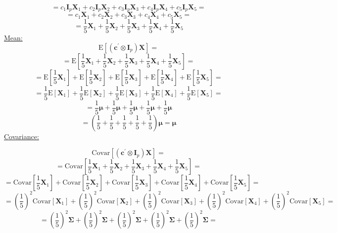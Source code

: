 \[
    =
    c_{1}\textbf{I}_{p}\textbf{X}_{1}
    +
    c_{2}\textbf{I}_{p}\textbf{X}_{2}
    +
    c_{3}\textbf{I}_{p}\textbf{X}_{3}
    +
    c_{4}\textbf{I}_{p}\textbf{X}_{4}
    +
    c_{5}\textbf{I}_{p}\textbf{X}_{5}
    =
\]
\[
    =
    c_{1}\textbf{X}_{1}
    +
    c_{2}\textbf{X}_{2}
    +
    c_{3}\textbf{X}_{3}
    +
    c_{4}\textbf{X}_{4}
    +
    c_{5}\textbf{X}_{5}
    =
\]
\[
    =
    \frac{1}{5}
    \textbf{X}_{1}
    +
    \frac{1}{5}
    \textbf{X}_{2}
    +
    \frac{1}{5}
    \textbf{X}_{3}
    +
    \frac{1}{5}
    \textbf{X}_{4}
    +
    \frac{1}{5}
    \textbf{X}_{5}
\]
\underline{Mean:}
\[
    \text{E}
    \left[
    \left( \textbf{c}^{\prime} \otimes \textbf{I}_{p} \right) \textbf{X}
    \right]
    =
\]
\[
    =
    \text{E}
    \left[
        \frac{1}{5}\textbf{X}_{1}
        +
        \frac{1}{5}\textbf{X}_{2}
        +
        \frac{1}{5}\textbf{X}_{3}
        +
        \frac{1}{5}\textbf{X}_{4}
        +
        \frac{1}{5}\textbf{X}_{5}
    \right]
    =
\]
\[
    =
    \text{E}\left[\frac{1}{5}\textbf{X}_{1}\right]
    +
    \text{E}\left[\frac{1}{5}\textbf{X}_{2}\right]
    +
    \text{E}\left[\frac{1}{5}\textbf{X}_{3}\right]
    +
    \text{E}\left[\frac{1}{5}\textbf{X}_{4}\right]
    +
    \text{E}\left[\frac{1}{5}\textbf{X}_{5}\right]
    =
\]
\[
    =
    \frac{1}{5}\text{E}\left[\textbf{X}_{1}\right]
    +
    \frac{1}{5}\text{E}\left[\textbf{X}_{2}\right]
    +
    \frac{1}{5}\text{E}\left[\textbf{X}_{3}\right]
    +
    \frac{1}{5}\text{E}\left[\textbf{X}_{4}\right]
    +
    \frac{1}{5}\text{E}\left[\textbf{X}_{5}\right]
    =
\]
\[
    =
    \frac{1}{5}\bm{\mu}
    +
    \frac{1}{5}\bm{\mu}
    +
    \frac{1}{5}\bm{\mu}
    +
    \frac{1}{5}\bm{\mu}
    +
    \frac{1}{5}\bm{\mu}
\]
\[
    =
    \left(\frac{1}{5}+\frac{1}{5}+\frac{1}{5}+\frac{1}{5}+\frac{1}{5}\right)\bm{\mu}
    =
    \bm{\mu}
\]
\underline{Covariance:}

\[
    \text{Covar}
    \left[
    \left( \textbf{c}^{\prime} \otimes \textbf{I}_{p} \right) \textbf{X}
    \right]
    =
\]
\[
    =
    \text{Covar}
    \left[
        \frac{1}{5}\textbf{X}_{1}
        +
        \frac{1}{5}\textbf{X}_{2}
        +
        \frac{1}{5}\textbf{X}_{3}
        +
        \frac{1}{5}\textbf{X}_{4}
        +
        \frac{1}{5}\textbf{X}_{5}
    \right]
    =
\]
\[
    =
    \text{Covar}\left[\frac{1}{5}\textbf{X}_{1}\right]
    +
    \text{Covar}\left[\frac{1}{5}\textbf{X}_{2}\right]
    +
    \text{Covar}\left[\frac{1}{5}\textbf{X}_{3}\right]
    +
    \text{Covar}\left[\frac{1}{5}\textbf{X}_{4}\right]
    +
    \text{Covar}\left[\frac{1}{5}\textbf{X}_{5}\right]
    =
\]
{\scriptsize
\[
    =
    {\left(\frac{1}{5}\right)}^{2}\text{Covar}\left[\textbf{X}_{1}\right]
    +
    {\left(\frac{1}{5}\right)}^{2}\text{Covar}\left[\textbf{X}_{2}\right]
    +
    {\left(\frac{1}{5}\right)}^{2}\text{Covar}\left[\textbf{X}_{3}\right]
    +
    {\left(\frac{1}{5}\right)}^{2}\text{Covar}\left[\textbf{X}_{4}\right]
    +
    {\left(\frac{1}{5}\right)}^{2}\text{Covar}\left[\textbf{X}_{5}\right]
    =
\]}
\[
    =
    {\left(\frac{1}{5}\right)}^{2}\bm{\Sigma}
    +
    {\left(\frac{1}{5}\right)}^{2}\bm{\Sigma}
    +
    {\left(\frac{1}{5}\right)}^{2}\bm{\Sigma}
    +
    {\left(\frac{1}{5}\right)}^{2}\bm{\Sigma}
    +
    {\left(\frac{1}{5}\right)}^{2}\bm{\Sigma}
    =
\]

